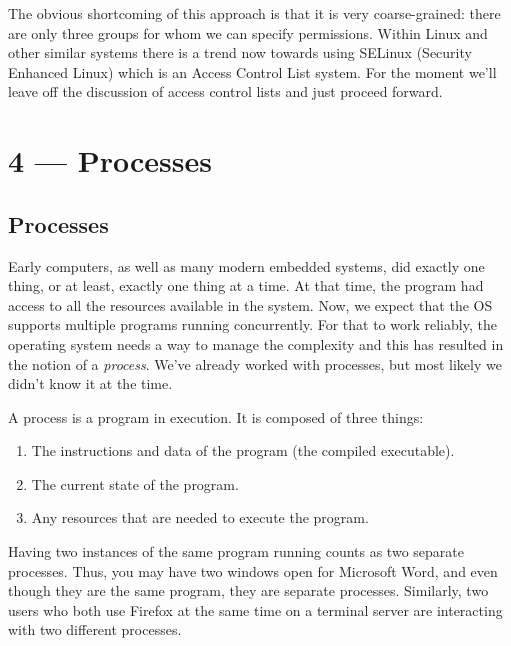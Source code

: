 \documentclass[a4paper]{report}
\begin{document}
The obvious shortcoming of this approach is that it is very coarse-grained: there are only three groups for whom we can specify permissions. Within Linux and other similar systems there is a trend now towards using SELinux (Security Enhanced Linux) which is an Access Control List system. For the moment we'll leave off the discussion of access control lists and just proceed forward.








\chapter*{4 --- Processes}


\section*{Processes}

Early computers, as well as many modern embedded systems, did exactly one thing, or at least, exactly one thing at a time. At that time, the program had access to all the resources available in the system. Now, we expect that the OS supports multiple programs running concurrently. For that to work reliably, the operating system needs a way to manage the complexity and this has resulted in the notion of a \textit{process}. We've already worked with processes, but most likely we didn't know it at the time.

A process is a program in execution. It is composed of three things:

\begin{enumerate}
	\item The instructions and data of the program (the compiled executable).
	\item The current state of the program.
	\item Any resources that are needed to execute the program.
\end{enumerate}

Having two instances of the same program running counts as two separate processes. Thus, you may have two windows open for Microsoft Word, and even though they are the same program, they are separate processes. Similarly, two users who both use Firefox at the same time on a terminal server are interacting with two different processes.
\end{document}
